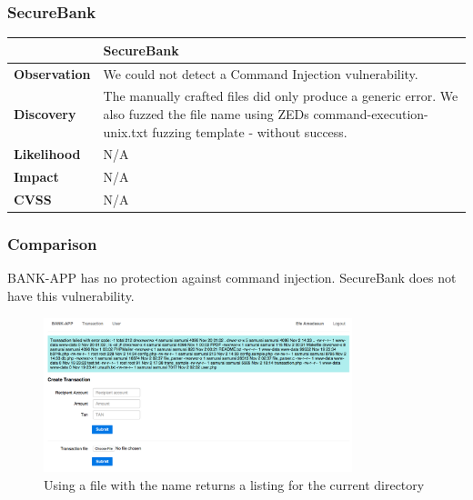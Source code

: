 \subsubsection{SecureBank}
\begin{tabular*}{\textwidth}{ p{} | p{} }\hline
    & \textbf{SecureBank} \\ \hline
    \textbf{Observation} & 
    	We could not detect a Command Injection vulnerability.
    \\
    \textbf{Discovery} &
    	The manually crafted files did only produce a generic error.
    	We also fuzzed the file name using ZEDs command-execution-unix.txt fuzzing template - without success.
    \\
    \textbf{Likelihood} & 
    	N/A
    \\
    \textbf{Impact} & 
    	N/A
	\\
    \textbf{CVSS} &
        N/A
	\\ \hline
\end{tabular*}

\subsubsection{Comparison}
BANK-APP has no protection against command injection.
SecureBank does not have this vulnerability.
\begin{figure}[p]
    \centering
    \includegraphics[width=0.8\textwidth]{figures/OTG-INPVAL-013-1.png}
    \caption{Using a file with the name  returns a listing for the current directory}
    \label{fig:OTG_AUTHN_004_1}
\end{figure}
\clearpage